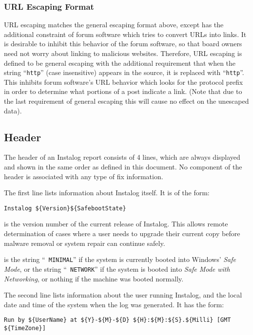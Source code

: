 \subsubsection{URL Escaping Format} \label{urlescape}
URL escaping matches the general escaping format above, except has the
additional constraint of forum software which tries to convert URLs into links.
It is desirable to inhibit this behavior of the forum software, so that board
owners need not worry about linking to malicious websites. Therefore, URL
escaping is defined to be general escaping with the additional requirement that
when the string ``\texttt{http}'' (case insensitive) appears in the source, it
is replaced with ``\texttt{htt}\texttt{p}''. This inhibits
forum software's URL behavior which looks for the protocol prefix in order to
determine what portions of a post indicate a link. (Note that due to the last
requirement of general escaping this will cause no effect on the unescaped data).

\subsection{Header}
The header of an Instalog report consists of 4 lines, which are always displayed
and shown in the same order as defined in this document. No component of the
header is associated with any type of fix information.

The first line lists information about Instalog itself. It is of the form:
\begin{verbatim}
Instalog ${Version}${SafebootState}
\end{verbatim}

 is the version number of the current release of Instalog. This
allows remote determination of cases where a user needs to upgrade their current
copy before malware removal or system repair can continue safely.

 is the string ``\verb| MINIMAL|'' if the system is currently
booted into Windows' \textit{Safe Mode}, or the string ``\verb| NETWORK|'' if
the system is booted into \textit{Safe Mode with Networking}, or nothing if the
machine was booted normally.

The second line lists information about the user running Instalog, and the local
date and time of the system when the log was generated. It has the form:
\begin{verbatim}
Run by ${UserName} at ${Y}-${M}-${D} ${H}:${M}:${S}.${Milli} [GMT ${TimeZone}]
\end{verbatim}

